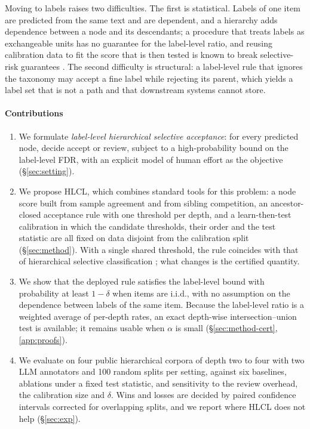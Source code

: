 \documentclass[preprint,12pt]{elsarticle}
\theoremstyle{definition}
\theoremstyle{remark}
\newcommand{\hlcl}{\textup{\textsc{HLCL}}}
\begin{document}
Moving to labels raises two difficulties. The first is statistical. Labels of
one item are predicted from the same text and are dependent, and a hierarchy
adds dependence between a node and its descendants; a procedure that treats
labels as exchangeable units has no guarantee for the label-level ratio, and
reusing calibration data to fit the score that is then tested is known to break
selective-risk guarantees \cite{perfield2026}. The second difficulty is structural: a label-level rule that
ignores the taxonomy may accept a fine label while rejecting its parent, which
yields a label set that is not a path and that downstream systems cannot store.

\paragraph{Contributions}
\begin{enumerate}
  \item We formulate \emph{label-level hierarchical selective acceptance}: for
  every predicted node, decide accept or review, subject to a high-probability
  bound on the label-level FDR, with an explicit model of human effort as the
  objective (\S\ref{sec:setting}).
  \item We propose \hlcl{}, which combines standard tools for this problem: a
  node score built from sample agreement and from sibling competition, an
  ancestor-closed acceptance rule with one threshold per depth, and a
  learn-then-test
  calibration in which the candidate thresholds, their order and the test
  statistic are all fixed on data disjoint from the calibration split
  (\S\ref{sec:method}). With a single shared threshold, the rule coincides with
  that of hierarchical selective classification \cite{goren2024hierarchical};
  what changes is the certified quantity.
  \item We show that the deployed rule satisfies the label-level bound with
  probability at least $1-\delta$ when items are i.i.d., with no assumption on
  the dependence between labels of the same item. Because the label-level ratio
  is a weighted average of per-depth rates, an exact depth-wise
  intersection--union test is available; it remains usable when $\alpha$ is
  small (\S\ref{sec:method-cert}, \ref{app:proofs}).
  \item We evaluate on four public hierarchical corpora of depth two to four
  with two LLM annotators and 100 random splits per setting, against six baselines,
  ablations under a fixed test statistic, and sensitivity to the review
  overhead, the calibration size and $\delta$. Wins and losses are decided by
  paired confidence intervals corrected for overlapping splits, and we report
  where \hlcl{} does not help (\S\ref{sec:exp}).
\end{enumerate}
\end{document}
